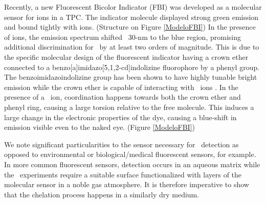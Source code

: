 \documentclass[aps,prl,reprint,longbibliography,superscriptaddress, english]{revtex4-1}
\newcommand{\completar}[1]{{\color{red} #1}}
\begin{document}
Recently, a new Fluorescent Bicolor Indicator (FBI) was developed as a molecular sensor for \Bapp ions in a TPC.\cite{rivilla_fluorescent_2020} The indicator molecule displayed strong green emission and bound tightly with \Bapp ions. (Structure on Figure \ref{ModeloFBI}) In the presence of \Bapp ions, the emission spectrum shifted ~30-nm to the blue region, promising additional discrimination for \bbonu\ by at least two orders of magnitude. This is due to the specific molecular design of the fluorescent indicator having a crown ether connected to a benzo[a]imidazo[5,1,2-cd]indolizine fluorophore by a phenyl group. The benzoimidazoindolizine group has been shown to have highly tunable bright emission\cite{Stasyuk_benzo,Levesque_general} while the crown ether is capable of interacting with \Bapp\ ions \cite{valeur_chemical,maleknia_cavity-size-dependent_2002}. In the presence of a \Bapp\ ion, coordination happens towards both the crown ether and phenyl ring, causing a large torsion relative to the free molecule. This induces a large change in the electronic properties of the dye, causing a blue-shift in emission visible even to the naked eye. (Figure \ref{ModeloFBI})

We note significant particularities to the sensor necessary for \bbonu\ detection as opposed to environmental or biological/medical fluorescent sensors, for example. In more common fluorescent sensors, detection occurs in an aqueous matrix while the \bbonu\ experiments require a suitable surface functionalized with layers of the molecular sensor in a noble gas atmosphere. It is therefore imperative to show that the chelation process happens in a similarly dry medium.



 
\end{document}
